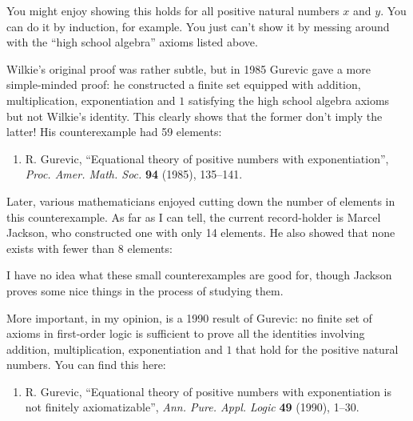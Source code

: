 \documentclass{article}
\def\tightlist{}
\renewcommand{\texttt}[1]{%
  \begingroup
  \ttfamily
  \begingroup\lccode`~=`/\lowercase{\endgroup\def~}{/\discretionary{}{}{}}%
  \begingroup\lccode`~=`[\lowercase{\endgroup\def~}{[\discretionary{}{}{}}%
  \begingroup\lccode`~=`.\lowercase{\endgroup\def~}{.\discretionary{}{}{}}%
  \catcode`/=\active\catcode`[=\active\catcode`.=\active
  \scantokens{#1\noexpand}%
  \endgroup
}
\begin{document}
You might enjoy showing this holds for all positive natural numbers
\(x\) and \(y\). You can do it by induction, for example. You just can't
show it by messing around with the ``high school algebra'' axioms listed
above.

Wilkie's original proof was rather subtle, but in 1985 Gurevic gave a
more simple-minded proof: he constructed a finite set equipped with
addition, multiplication, exponentiation and \(1\) satisfying the high
school algebra axioms but not Wilkie's identity. This clearly shows that
the former don't imply the latter! His counterexample had 59 elements:

\begin{enumerate}
\def\labelenumi{\arabic{enumi})}
\setcounter{enumi}{13}
\tightlist
\item
  R. Gurevic, ``Equational theory of positive numbers with
  exponentiation'', \emph{Proc. Amer. Math. Soc.} \textbf{94} (1985),
  135--141.
\end{enumerate}

Later, various mathematicians enjoyed cutting down the number of
elements in this counterexample. As far as I can tell, the current
record-holder is Marcel Jackson, who constructed one with only 14
elements. He also showed that none exists with fewer than 8 elements:


I have no idea what these small counterexamples are good for, though
Jackson proves some nice things in the process of studying them.

More important, in my opinion, is a 1990 result of Gurevic: no finite
set of axioms in first-order logic is sufficient to prove all the
identities involving addition, multiplication, exponentiation and \(1\)
that hold for the positive natural numbers. You can find this here:

\begin{enumerate}
\def\labelenumi{\arabic{enumi})}
\setcounter{enumi}{15}
\tightlist
\item
  R. Gurevic, ``Equational theory of positive numbers with
  exponentiation is not finitely axiomatizable'', \emph{Ann. Pure. Appl.
  Logic} \textbf{49} (1990), 1--30.
\end{enumerate}
\end{document}
